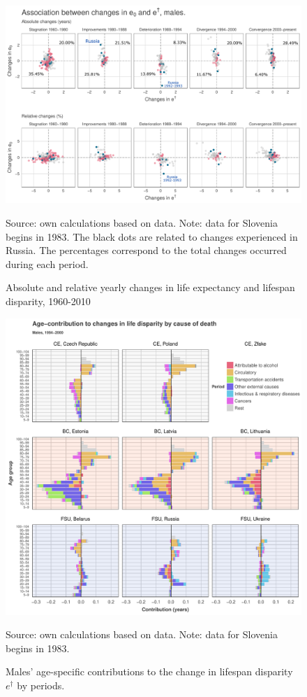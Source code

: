 \documentclass{article}
\begin{document}
\begin{figure}[h!]
\centering
\caption{Absolute and relative yearly changes in life expectancy and lifespan disparity, 1960-2010}
\label{Abs_changes}
\begin{center}
\vspace{-.5cm}
\includegraphics[scale=.45]{Figures/Figure_3.pdf}
\end{center}
Source: own calculations based on \citet{HMD} data. Note: data for Slovenia begins in 1983. The black dots are related to changes experienced in Russia. The percentages correspond to the total changes occurred during each period.
\end{figure}

\newpage

\begin{figure}[h!]
\caption{Males' age-specific contributions to the change in lifespan disparity $e^\dagger$ by periods.}
\label{MalesDecomp}
\centering
\begin{center}
\includegraphics[scale=.85]{Figures/Figure_4.pdf}
\end{center}
Source: own calculations based on \citet{HMD} data. Note: data for Slovenia begins in 1983.
\end{figure}
\end{document}
